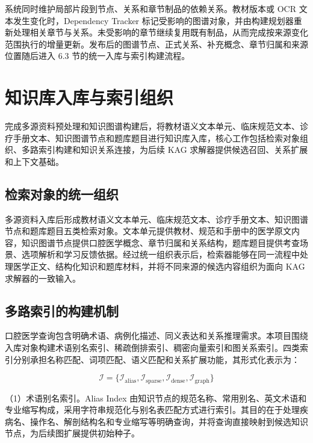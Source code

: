 系统同时维护局部片段到节点、关系和章节制品的依赖关系。教材版本或 OCR 文本发生变化时，Dependency Tracker 标记受影响的图谱对象，并由构建规划器重新处理相关章节与关系。未受影响的章节继续复用既有制品，从而完成按来源变化范围执行的增量更新。发布后的图谱节点、正式关系、补充概念、章节归属和来源位置随后进入 6.3 节的统一入库与索引构建流程。

\section{知识库入库与索引组织}

完成多源资料预处理和知识图谱构建后，将教材语义文本单元、临床规范文本、诊疗手册文本、知识图谱节点和题库题目进行知识库入库，核心工作包括检索对象组织、多路索引构建和知识关系连接，为后续 KAG 求解器提供候选召回、关系扩展和上下文基础。

\subsection{检索对象的统一组织}

多源资料入库后形成教材语义文本单元、临床规范文本、诊疗手册文本、知识图谱节点和题库题目五类检索对象。文本单元提供教材、规范和手册中的医学原文内容，知识图谱节点提供口腔医学概念、章节归属和关系结构，题库题目提供考查场景、选项解析和学习反馈依据。经过统一组织表示后，检索器能够在同一流程中处理医学正文、结构化知识和题库材料，并将不同来源的候选内容组织为面向 KAG 求解器的一致输入。

\subsection{多路索引的构建机制}

口腔医学查询包含明确术语、病例化描述、同义表达和关系推理需求。本项目围绕入库对象构建术语别名索引、稀疏倒排索引、稠密向量索引和图关系索引。四类索引分别承担名称匹配、词项匹配、语义匹配和关系扩展功能，其形式化表示为：

\begin{equation}
  \label{eq:multi-index-set}
  \mathcal{I}=\{\mathcal{I}_{\mathrm{alias}},\mathcal{I}_{\mathrm{sparse}},\mathcal{I}_{\mathrm{dense}},\mathcal{I}_{\mathrm{graph}}\}
\end{equation}

（1）术语别名索引。Alias Index 由知识节点的规范名称、常用别名、英文术语和专业缩写构成，采用字符串规范化与别名表匹配方式进行索引。其目的在于处理疾病名、操作名、解剖结构名和专业缩写等明确查询，并将查询直接映射到候选知识节点，为后续图扩展提供初始种子。

